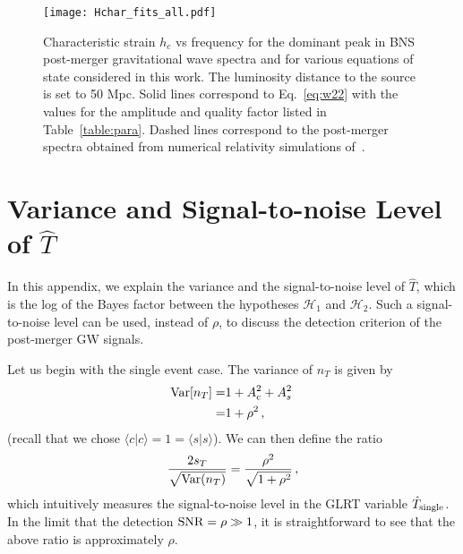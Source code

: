 \documentclass[prd,aps,floatfix,superscriptaddress,nofootinbib,twocolumn,10pt,English]{revtex4-1}
\begin{document}
\begin{figure}[tb]
\texttt{[image: Hchar\_fits\_all.pdf]}
\caption{Characteristic strain $h_c$ vs frequency for the dominant
  peak in BNS post-merger gravitational wave spectra and for various
  equations of state considered in this work. The luminosity distance
  to the source is set to 50 Mpc. Solid lines correspond
  to Eq.~\eqref{eq:w22} with the values for the amplitude and quality
  factor listed in Table~\ref{table:para}. Dashed lines correspond to
  the post-merger spectra obtained from numerical relativity
  simulations
  of~\cite{Sekiguchi:2011mc,Stergioulas:2011gd,Palenzuela:2015dqa}.}
\label{fig:hcfits}
\end{figure}

\section{Variance and Signal-to-noise Level of $\hat T$}
\label{appendixA}

In this appendix, we explain the variance and the signal-to-noise level of $\hat T$, 
which is the log of the Bayes factor between the 
hypotheses $\mathcal{H}_1$ and $\mathcal{H}_2$. Such a signal-to-noise level
can be used, instead of $\rho$, to discuss the detection criterion of the post-merger GW signals.

Let us begin with the single event case.
The variance of $n_T$ is given by 
\begin{align}
{\rm Var}[n_T]= &1+ A^2_c+A^2_s\,\nonumber \\
=& 1 +  \rho^2\,,
\end{align}
(recall that we chose $\langle c | c \rangle = 1 = \langle s | s \rangle$).
We can then define the ratio
\begin{align}
\frac{2 s_T}{\sqrt{{\rm Var}(n_T)}} = \frac{\rho^2}{\sqrt{1+ \rho^2}}\,,
\end{align}
which intuitively measures the signal-to-noise level in the GLRT
variable $\hat{T}_{\rm single}$. In the limit that the detection ${\rm
  SNR} = \rho \gg 1$, it is straightforward to see that the above
ratio is approximately $\rho$.
\end{document}
